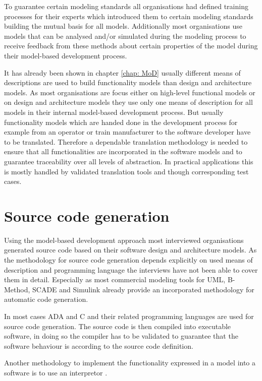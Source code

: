 \documentclass{./template/openetcs_report}
\begin{document}
To guarantee certain modeling standards all organisations had defined training processes for their experts which introduced them to certain modeling standards building the mutual basis for all models.  Additionally most organisations use models that can be analysed and/or simulated during the modeling process to receive feedback from these methods about certain properties of the model during their model-based development process.

It has already been shown in chapter \ref{chap: MoD} usually different means of descriptions are used to build functionality models than design and architecture models. As most organisations are focus either on high-level functional models or on design and architecture models they use only one means of description for all models in their internal model-based development process. But usually functionality models which are handed done in the development process for example from an operator or train manufacturer to the software developer have to be translated. Therefore a dependable translation methodology is needed to ensure that all functionalities are incorporated in the software models and to guarantee traceability over all levels of abstraction. In practical applications this is mostly handled by validated translation tools and though corresponding test cases.

\section{Source code generation}

Using the model-based development approach most interviewed organisations generated source code based on their software design and architecture models. As the  methodology for source code generation depends explicitly on used means of description and programming language the interviews have not been able to cover them in detail. Especially as most commercial modeling tools for UML, B-Method, SCADE and Simulink already provide an incorporated methodology for automatic code generation. 

In most cases ADA and C and their related programming languages are used for source code generation. The source code is then compiled into executable software, in doing so the compiler has to be validated to guarantee that the software behaviour is according to the source code definition.

Another methodology to implement the functionality expressed in a model into a software is to use an interpretor .
\end{document}
